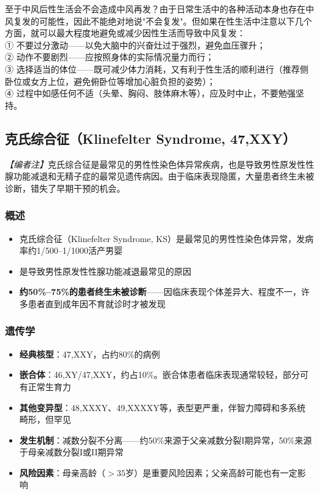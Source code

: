 \begin{tcolorbox}[colback=pink!5!white,colframe=red!50!black,title=贴心小叮咛]
至于中风后性生活会不会造成中风再发？由于日常生活中的各种活动本身也存在中风复发的可能性，因此不能绝对地说"不会复发"。但如果在性生活中注意以下几个方面，就可以最大程度地避免或减少因性生活而导致中风复发：\\
① 不要过分激动——以免大脑中的兴奋灶过于强烈，避免血压骤升；\\
② 动作不要剧烈——应按照身体的实际情况量力而行；\\
③ 选择适当的体位——既可减少体力消耗，又有利于性生活的顺利进行（推荐侧卧位或女方上位，避免俯卧位等增加心脏负担的姿势）；\\
④ 过程中如感任何不适（头晕、胸闷、肢体麻木等），应及时中止，不要勉强坚持。
\end{tcolorbox}

\subsection{克氏综合征（Klinefelter Syndrome, 47,XXY）}

\noindent\textit{【编者注】}克氏综合征是最常见的男性性染色体异常疾病，也是导致男性原发性性腺功能减退和无精子症的最常见遗传病因。由于临床表现隐匿，大量患者终生未被诊断，错失了早期干预的机会。

\subsubsection{概述}

\begin{itemize}[leftmargin=2cm]
	\item 克氏综合征（Klinefelter Syndrome, KS）是最常见的男性性染色体异常，发病率约1/500--1/1000活产男婴
	\item 是导致男性原发性性腺功能减退最常见的原因
	\item \textbf{约50\%--75\%的患者终生未被诊断}——因临床表现个体差异大、程度不一，许多患者直到成年因不育就诊时才被发现
\end{itemize}

\subsubsection{遗传学}

\begin{itemize}[leftmargin=2cm]
	\item \textbf{经典核型}：47,XXY，占约80\%的病例
	\item \textbf{嵌合体}：46,XY/47,XXY，约占10\%。嵌合体患者临床表现通常较轻，部分可有正常生育力
	\item \textbf{其他变异型}：48,XXXY、49,XXXXY等，表型更严重，伴智力障碍和多系统畸形，但罕见
	\item \textbf{发生机制}：减数分裂不分离——约50\%来源于父亲减数分裂I期异常，50\%来源于母亲减数分裂I或II期异常
	\item \textbf{风险因素}：母亲高龄（$>35$岁）是重要风险因素；父亲高龄可能也有一定影响
\end{itemize}

